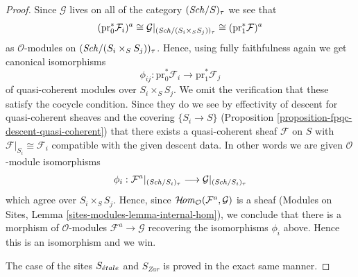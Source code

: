 \begin{proof}
\medskip\noindent
Since $\mathcal{G}$ lives on all of the category
$(\mathit{Sch}/S)_\tau$ we see that
$$
(\text{pr}_0^*\mathcal{F}_i)^a
\cong
\mathcal{G}|_{(\mathit{Sch}/(S_i \times_S S_j))_\tau}
\cong
(\text{pr}_1^*\mathcal{F})^a
$$
as $\mathcal{O}$-modules on $(\mathit{Sch}/(S_i \times_S S_j))_\tau$.
Hence, using fully faithfulness again we get canonical isomorphisms
$$
\phi_{ij} :
\text{pr}_0^*\mathcal{F}_i
\longrightarrow
\text{pr}_1^*\mathcal{F}_j
$$
of quasi-coherent modules over $S_i \times_S S_j$. We omit the verification
that these satisfy the cocycle condition. Since they do we see by
effectivity of descent for quasi-coherent sheaves and the covering
$\{S_i \to S\}$ (Proposition \ref{proposition-fpqc-descent-quasi-coherent})
that there exists a quasi-coherent sheaf $\mathcal{F}$ on $S$
with $\mathcal{F}|_{S_i} \cong \mathcal{F}_i$ compatible
with the given descent data. In other words we are given
$\mathcal{O}$-module isomorphisms
$$
\phi_i :
\mathcal{F}^a|_{(\mathit{Sch}/S_i)_\tau}
\longrightarrow
\mathcal{G}|_{(\mathit{Sch}/S_i)_\tau}
$$
which agree over $S_i \times_S S_j$. Hence, since
$\mathop{\mathcal{H}\!\mathit{om}}\nolimits_\mathcal{O}(\mathcal{F}^a, \mathcal{G})$ is
a sheaf (Modules on Sites, Lemma \ref{sites-modules-lemma-internal-hom}),
we conclude that
there is a morphism of $\mathcal{O}$-modules $\mathcal{F}^a \to \mathcal{G}$
recovering the isomorphisms $\phi_i$ above. Hence this is an isomorphism
and we win.

\medskip\noindent
The case of the sites $S_{\acute{e}tale}$ and $S_{Zar}$ is proved in the
exact same manner.
\end{proof}

